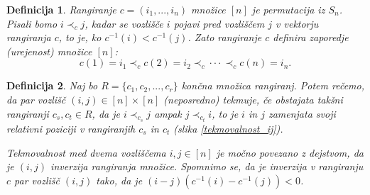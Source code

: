\documentclass[a4paper, 12pt]{book}
\newtheorem{definicija}{Definicija}[chapter]
\begin{document}
\begin{definicija}
    Rangiranje $c = (i_1, ..., i_n)$ množice $[n]$ je permutacija iz $S_n$. Pisali bomo $i \prec_c j$, kadar se vozlišče $i$ pojavi pred vozliščem $j$ v vektorju rangiranja $c$, to je, ko $c^{-1}(i) < c^{-1}(j)$. Zato rangiranje $c$ definira zaporedje (urejenost) množice $[n]$:
    \[
        c(1) = i_1 \prec_c c(2) = i_2 \prec_c \cdot\cdot\cdot \prec_c c(n) = i_n.
    \]
\end{definicija}

\begin{definicija}
\label{def_tekmovalnosti}
    Naj bo $R = \{c_1, c_2, ..., c_r\}$ končna množica rangiranj. Potem rečemo, da par vozlišč $(i, j) \in [n] \times [n]$ (neposredno) tekmuje, če obstajata takšni rangiranji $c_s, c_t \in R$, da je $i \prec_{c_s} j$ ampak $j \prec_{c_t} i$, to je $i$ in $j$ zamenjata svoji relativni poziciji v rangiranjih $c_s$ in $c_t$ (slika \ref{tekmovalnost_ij}).

    Tekmovalnost med dvema vozliščema $i, j \in [n]$ je močno povezano z dejstvom, da je $(i, j)$ inverzija rangiranja množice. Spomnimo se, da je inverzija v rangiranju $c$ par vozlišč $(i, j)$ tako, da je $(i-j)(c^{-1}(i) - c^{-1}(j)) < 0$.
\end{definicija}
\end{document}
